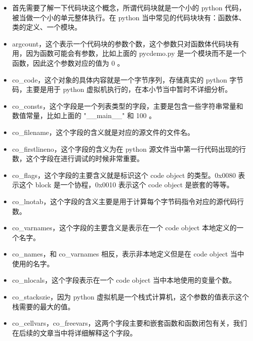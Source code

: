 \begin{itemize}
\item 首先需要了解一下代码块这个概念，所谓代码块就是一个小的 python 代码，被当做一个小的单元整体执行。在 python 当中常见的代码块块有：函数体、类的定义、一个模块。 
\item argcount，这个表示一个代码块的参数个数，这个参数只对函数体代码块有用，因为函数可能会有参数，比如上面的 pycdemo.py 是一个模块而不是一个函数，因此这个参数对应的值为 0 。 
\item co\_code，这个对象的具体内容就是一个字节序列，存储真实的 python 字节码，主要是用于 python 虚拟机执行的，在本小节当中暂时不详细分析。 
\item co\_consts，这个字段是一个列表类型的字段，主要是包含一些字符串常量和数值常量，比如上面的 "\_\_main\_\_" 和 100 。 
\item co\_filename，这个字段的含义就是对应的源文件的文件名。 
\item co\_firstlineno，这个字段的含义为在 python 源文件当中第一行代码出现的行数，这个字段在进行调试的时候非常重要。 
\item co\_flags，这个字段的主要含义就是标识这个 code object 的类型。0x0080 表示这个 block 是一个协程，0x0010 表示这个 code object 是嵌套的等等。 
\item co\_lnotab，这个字段的含义主要是用于计算每个字节码指令对应的源代码行数。 
\item co\_varnames，这个字段的主要含义是表示在一个 code object 本地定义的一个名字。 
\item co\_names，和 co\_varnames 相反，表示非本地定义但是在 code object 当中使用的名字。 
\item co\_nlocals，这个字段表示在一个 code object 当中本地使用的变量个数。 
\item co\_stackszie，因为 python 虚拟机是一个栈式计算机，这个参数的值表示这个栈需要的最大的值。 
\item co\_cellvars，co\_freevars，这两个字段主要和嵌套函数和函数闭包有关，我们在后续的文章当中将详细解释这个字段。 
\end{itemize}
